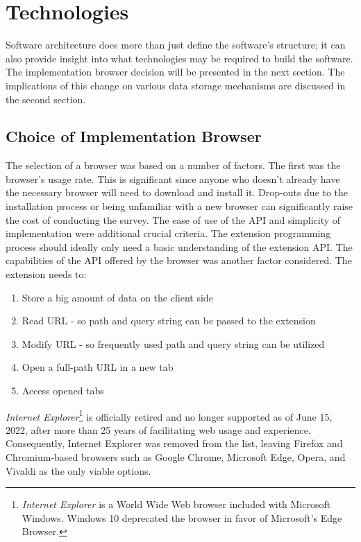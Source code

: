 \section{Technologies}
\label{technologies_used}
Software architecture does more than just define the software's structure; it can also provide insight into what technologies may be required to build the software. The implementation browser decision will be presented in the next section. The implications of this change on various data storage mechanisms are discussed in the second section.

\subsection{Choice of Implementation Browser}
The selection of a browser was based on a number of factors. The first was the browser's usage rate. This is significant since anyone who doesn't already have the necessary browser will need to download and install it. Drop-outs due to the installation process or being unfamiliar with a new browser can significantly raise the cost of conducting the survey. The ease of use of the API and simplicity of implementation were additional crucial criteria. The extension programming process should ideally only need a basic understanding of the extension API. The capabilities of the API offered by the browser was another factor considered. The extension needs to:

\begin{enumerate}
  \item Store a big amount of data on the client side
  \item Read URL - so path and query string can be passed to the extension
  \item Modify URL - so frequently used path and query string can be utilized
  \item Open a full-path URL in a new tab
  \item Access opened tabs
\end{enumerate}

\emph{Internet Explorer}\footnote{\emph{Internet Explorer} is a World Wide Web browser included with Microsoft Windows. Windows 10 deprecated the browser in favor of Microsoft's Edge Browser.} is officially retired and no longer supported as of June 15, 2022, after more than 25 years of facilitating web usage and experience. Consequently, Internet Explorer was removed from the list, leaving Firefox and Chromium-based browsers such as Google Chrome, Microsoft Edge, Opera, and Vivaldi as the only viable options.

